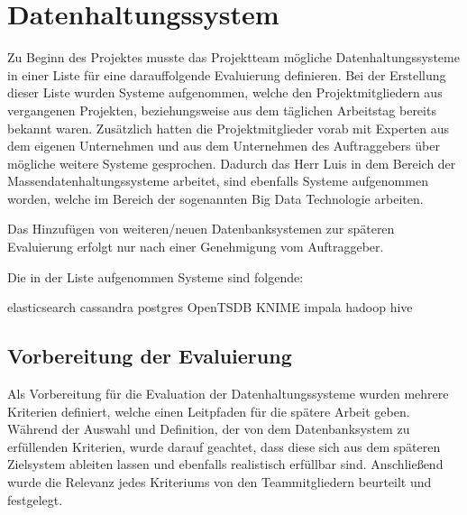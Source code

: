 \section{Datenhaltungssystem}
\label{sec:datenhaltungssystem}
Zu Beginn des Projektes musste das Projektteam mögliche Datenhaltungssysteme in
einer Liste für eine darauffolgende Evaluierung definieren. Bei der Erstellung
dieser Liste wurden Systeme aufgenommen, welche den Projektmitgliedern aus
vergangenen Projekten, beziehungsweise aus dem täglichen Arbeitstag bereits
bekannt waren. Zusätzlich hatten die Projektmitglieder vorab mit Experten aus
dem eigenen Unternehmen und aus dem Unternehmen des Auftraggebers über mögliche
weitere Systeme gesprochen.  Dadurch das Herr Luis in dem Bereich der
Massendatenhaltungssysteme arbeitet, sind ebenfalls Systeme aufgenommen worden,
welche im Bereich der sogenannten Big Data Technologie arbeiten.

Das Hinzufügen von weiteren/neuen Datenbanksystemen zur späteren
Evaluierung erfolgt nur nach einer Genehmigung vom Auftraggeber.

Die in der Liste aufgenommen Systeme sind folgende:

\begin{outline}
  \1 elasticsearch
  \1 cassandra
  \1 postgres
  \1 OpenTSDB
  \1 KNIME
  \1 impala
  \1 hadoop
  \1 hive
\end{outline}
\nl%

\subsection{Vorbereitung der Evaluierung}
\label{subsec:DBS_vorbereitung_der_evaluierung}
Als Vorbereitung für die Evaluation der Datenhaltungssysteme wurden mehrere
Kriterien definiert, welche einen Leitpfaden für die spätere Arbeit geben.
Während der Auswahl und Definition, der von dem Datenbanksystem zu erfüllenden
Kriterien, wurde darauf geachtet, dass diese sich aus dem späteren Zielsystem
ableiten lassen und ebenfalls realistisch erfüllbar sind. Anschließend wurde
die Relevanz jedes Kriteriums von den Teammitgliedern beurteilt und festgelegt.

